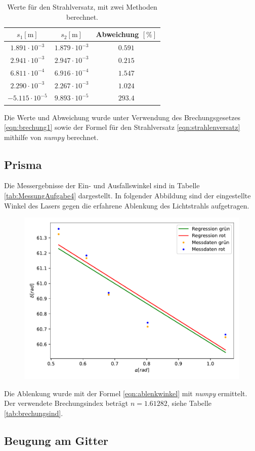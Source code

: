 \begin{table}
  \centering
  \caption{Werte für den Strahlversatz, mit zwei Methoden berechnet.}
  \label{tab:strahlversatzausw}
  \begin{tabular}
    {S S S}
    \toprule
    {$s_1 [\si{\meter}]$} & {$s_2 [\si{\meter}]$} & {Abweichung $[\si{\percent}]$} \\
    \midrule
    {$1.891 \cdot 10^{-3}$} & {$1.879 \cdot 10^{-3}$} & {$0.591$} \\
    {$2.941 \cdot 10^{-3}$} & {$2.947 \cdot 10^{-3}$} & {$0.215$} \\
    {$6.811 \cdot 10^{-4}$} & {$6.916 \cdot 10^{-4}$} & {$1.547$} \\
    {$2.290 \cdot 10^{-3}$} & {$2.267 \cdot 10^{-3}$} & {$1.024$} \\
    {$-5.115 \cdot 10^{-5}$} & {$9.893 \cdot 10^{-5}$} & {$293.4$} \\
    \bottomrule
  \end{tabular}
\end{table}
\noindent
Die Werte und Abweichung wurde unter Verwendung des Brechungsgesetzes \eqref{eqn:brechung1} sowie der Formel für den
Strahlversatz \eqref{eqn:strahlenversatz} mithilfe von \textit{numpy} berechnet.

\subsection{Prisma}
\label{sec:prismaauswertung}
Die Messergebnisse der Ein- und Ausfallswinkel sind in Tabelle \ref{tab:MessungAufgabe4} dargestellt. In folgender Abbildung sind der eingestellte Winkel des Lasers gegen die erfahrene Ablenkung des Lichtstrahls aufgetragen.
\begin{figure}[H]
  \centering
  \includegraphics[scale=0.7]{auswertung/plot4.pdf}
  \label{fig:plot4ausw}
\end{figure}
Die Ablenkung wurde mit der Formel \eqref{eqn:ablenkwinkel} mit \textit{numpy} ermittelt. Der verwendete Brechungsindex beträgt $n = 1.61282$, siehe Tabelle \ref{tab:brechungsind}.
\subsection{Beugung am Gitter}
\label{sec:beugungauswertung}

